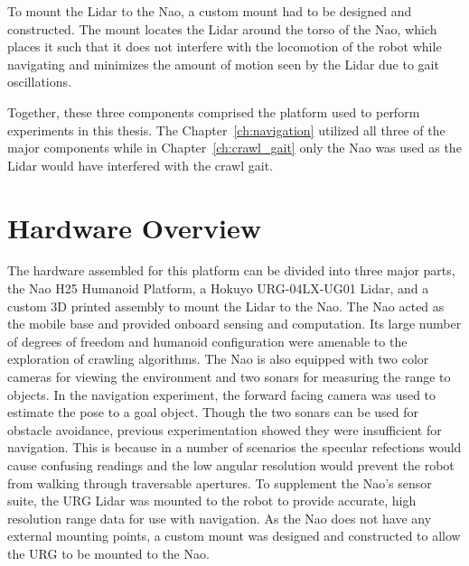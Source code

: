 To mount the Lidar to the Nao, a custom mount had to be designed and constructed.
The mount locates the Lidar around the torso of the Nao, which places it such
that it does not interfere with the locomotion of the robot while navigating
and minimizes the amount of motion seen by the Lidar due to gait oscillations.

Together, these three components comprised the platform used to perform experiments
in this thesis. The Chapter~\ref{ch:navigation} utilized all three of the major
components while in Chapter~\ref{ch:crawl_gait} only the Nao was used as the
Lidar would have interfered with the crawl gait.

\section{Hardware Overview}

The hardware assembled for this platform can be divided into three major parts,
the Nao H25 Humanoid Platform, a Hokuyo URG-04LX-UG01 Lidar, and a custom 3D
printed assembly to mount the Lidar to the Nao.
The Nao acted as the mobile base and provided onboard sensing and computation. 
Its large number of degrees of freedom and humanoid configuration were amenable
to the exploration of crawling algorithms.
The Nao is also equipped with two color cameras for viewing the environment
and two sonars for measuring the range to objects.
In the navigation experiment, the forward facing camera was used to estimate
the pose to a goal object.
Though the two sonars can be used for obstacle
avoidance, previous experimentation showed they
were insufficient for navigation. This is because in a number of scenarios the
specular refections would cause confusing readings and the low angular
resolution would prevent the robot from walking through traversable apertures.
To supplement the Nao's sensor suite, the URG Lidar was mounted to the robot
to provide accurate, high resolution range data for use with navigation.
As the Nao does not have any external mounting points, a custom mount was
designed and constructed to allow the URG to be mounted to the Nao.



\FloatBarrier

\FloatBarrier

\FloatBarrier


